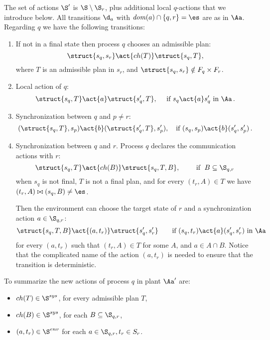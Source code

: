 \documentclass{llncs}
\newcommand{\loc}{\mathit{dom}}
\newcommand{\Ssys}{\S^{sys}}
\newcommand{\Senv}{\S^{env}}
\newcommand{\ch}{\mathop{ch}}
\begin{document}
The set of actions $\S'$ is $\S \setminus \S_r$, plus
additional local $q$-actions that we introduce below.
All transitions $\d_a$ with $\loc(a) \cap \{q,r\}=\es$ are as in $\Aa$.
Regarding $q$ we have the following transitions:
\begin{enumerate}
\item If not in a final state then process $q$ chooses an admissible
  plan:
  \begin{equation*}
\struct{s_q,s_r} \act{\ch(T)} \struct{s_q,T},    
  \end{equation*}
where $T$ is an admissible plan in $s_r$, and
  $\struct{s_q,s_r} \notin F_q \times F_r$.

\item Local action of $q$:
\[
\struct{s_q,T} \act{a} \struct{s'_q,T}, \quad\text{ if } s_q
\act{a} s'_q \text{ in } \Aa\,.
\]
\item Synchronization between $q$ and $p \not= r$:
\[(\struct{s_q,T},s_p) \act{b} (\struct{s'_q,T},s'_p), \quad\text{if }
  (s_q,s_p) \act{b} (s'_q,s'_p)\, .\]
\item Synchronization between $q$ and $r$. Process $q$ declares the
  communication actions with $r$:
  \begin{equation*}
    \struct{s_q,T} \act{\ch(B)} \struct{s_q,T,B},\qquad \text{ if }\;  
     B \subseteq \S_{q,r}\,
  \end{equation*}
  when $s_q$ is not final,  $T$ is not a final plan, and for every
  $(t_r,A)\in T$ we have $(t_r,A) \bowtie  (s_q,B)\not=\es$.




  Then the environment can choose the target state of $r$ and a
  synchronization action $a \in \S_{q,r}$:
  \begin{equation*}
\struct{s_q,T,B} \act{(a,t_r)} \struct{s'_q,s'_r}\qquad \text{if
  $(s_q,t_r) \act{a} (s'_q,s'_r)$ in $\Aa$}
  \end{equation*}
  for every $(a,t_r)$ such that $(t_r,A)\in T$ for some $A$, and $a\in
  A\cap B$. Notice that the
complicated name of the action $(a,t_r)$ is needed to ensure
that the transition is deterministic.

\end{enumerate}

To summarize the new actions of process $q$ in plant $\Aa'$ are:
\begin{itemize}
\item $\ch(T) \in \Ssys$, for every admissible plan  $T$,
\item $\ch(B) \in \Ssys$, for each $B \subseteq \S_{q,r}$,
\item $(a,t_r) \in \Senv$ for each
  $a \in \S_{q,r},t_r \in S_r$.
\end{itemize}
\end{document}
